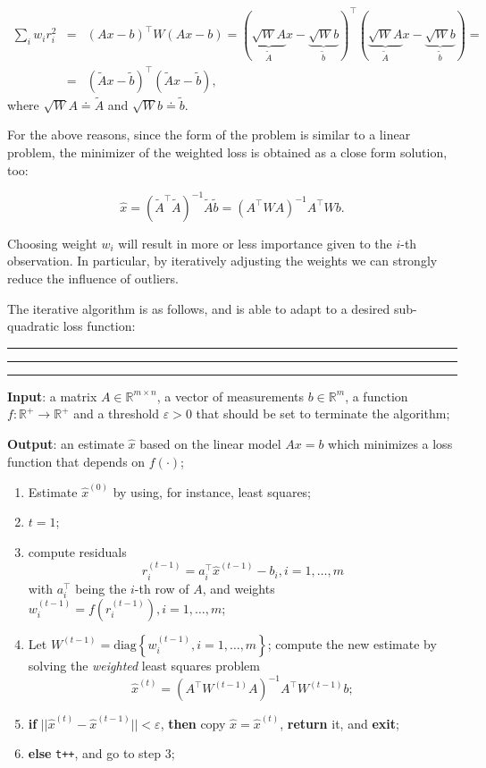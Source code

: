 \documentclass[10pt]{report}
\begin{document}
\[\begin{array}{lll}\sum_i w_i r_i^2 & = & (Ax - b)^\top W (Ax - b) = (\underbrace{\sqrt{W}A}_{\tilde A}x -\underbrace{\sqrt{W}b}_{\tilde b})^\top (\underbrace{\sqrt{W}A}_{\tilde A}x - \underbrace{\sqrt{W}b}_{\tilde b}) = \\ & = & \left(\tilde A x - \tilde b\right)^\top \left(\tilde A x - \tilde b \right),\end{array}\]
where \(\sqrt{W}A \doteq \tilde A\) and \(\sqrt{W} b \doteq \tilde b\).

For the above reasons, since the form of the problem is similar to a
linear problem, the minimizer of the weighted loss is obtained as a
close form solution, too:

\[\hat x = \left(\tilde A^\top \tilde A\right)^{-1} \tilde A \tilde b = \left(A^\top W A\right)^{-1} A^\top W b.\]

Choosing weight \(w_i\) will result in more or less importance given to
the \(i\)-th observation. In particular, by iteratively adjusting the
weights we can strongly reduce the influence of outliers.

The iterative algorithm is as follows, and is able to adapt to a desired
sub-quadratic loss function:

\vspace*{0.6cm}\hrule
\hrule
\hrule
\vspace*{0.4cm}

\textbf{Input}: a matrix \(A \in \mathbb{R}^{m \times n}\), a vector of
measurements \(b \in \mathbb{R}^m\), a function
\(f:\mathbb{R}^+ \rightarrow \mathbb{R}^+\) and a threshold
\(\varepsilon > 0\) that should be set to terminate the algorithm;

\textbf{Output}: an estimate \(\hat{x}\) based on the linear model \(Ax = b\)
which minimizes a loss function that depends on \(f(\cdot)\);

\begin{enumerate}
\item Estimate \(\hat x ^{(0)}\) by using, for instance, least squares;
\item \(t = 1\);
\item compute residuals
\[r_i^{(t - 1)} = a_i^\top\hat x ^{(t - 1)} - b_i, i = 1, \dots, m\]
with \(a_i^\top\) being the \(i\)-th row of \(A\), and weights
\(w_i^{(t-1)} = f(r_i^{(t-1)}), i=1,\dots, m\);
\item Let
\(W^{(t - 1)} = \mbox{diag}\left\{w_i^{(t - 1)}, i = 1,\dots, m\right\}\);
compute the new estimate by solving the \emph{weighted} least squares
problem
\[\hat x^{(t)} = \left(A^\top W^{(t-1)} A\right)^{-1}A^\top W^{(t-1)}b;\]
\item \textbf{if} \(||\hat x ^{(t)} - \hat x ^{(t-1)}|| < \varepsilon\), \textbf{then}
copy \(\hat x = \hat x ^{(t)}\), \textbf{return} it, and \textbf{exit};
\item \textbf{else} \texttt{t++}, and go to step \(3\);
\end{enumerate}
\end{document}

